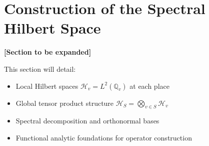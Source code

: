 \section{Construction of the Spectral Hilbert Space}
\label{sec:hilbert_space}

\textbf{[Section to be expanded]}

This section will detail:
\begin{itemize}
\item Local Hilbert spaces $\mathcal{H}_v = L^2(\mathbb{Q}_v)$ at each place
\item Global tensor product structure $\mathcal{H}_S = \bigotimes_{v \in S} \mathcal{H}_v$
\item Spectral decomposition and orthonormal bases
\item Functional analytic foundations for operator construction
\end{itemize}
